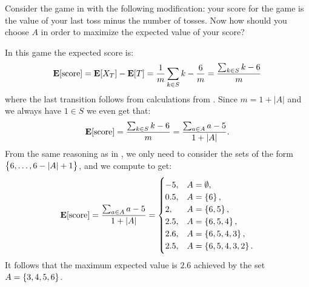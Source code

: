 \documentclass[11pt,a4paper]{article}
\begin{document}
\begin{exercise}
  Consider the game in  with the following modification:
  your score for the game is the value of your last toss minus the
  number of tosses.
  Now how should you choose $A$ in order to maximize the expected value of
  your score?
\end{exercise}
\begin{solution}
  In this game the expected score is:
  \[
    \mathbf{E}[\text{score}] =
    \mathbf{E}[X_T] - \mathbf{E}[T] =
    \frac{1}{m} \sum_{k \in S} k - \frac{6}{m} =
    \frac{\sum_{k \in S} k - 6}{m}
  \]
  where the last transition follows from calculations from .
  Since $m = 1 + |A|$ and we always have $1 \in S$ we
  even get that:
  \[
    \mathbf{E}[\text{score}] =
    \frac{\sum_{k \in S} k - 6}{m} =
    \frac{\sum_{a \in A} a - 5}{1 + |A|}.
  \]
  From the same reasoning as in ,
  we only need to consider the sets of the form $\left\{6,\dots,6-|A|+1\right\}$,
  and we compute to get:
  \[
    \mathbf{E}[\text{score}] =
    \frac{\sum_{a \in A} a - 5}{1 + |A|} =
    \begin{cases}
      -5, &A = \emptyset, \\
      0.5, &A = \left\{6\right\}, \\
      2, &A = \left\{6,5\right\}, \\
      2.5, &A = \left\{6,5,4\right\}, \\
      2.6, &A = \left\{6,5,4,3\right\}, \\
      2.5, &A = \left\{6,5,4,3,2\right\}.
    \end{cases}
  \]
  It follows that the maximum expected value is $2.6$ achieved by
  the set $A = \left\{3,4,5,6\right\}$.
\end{solution}
\end{document}
